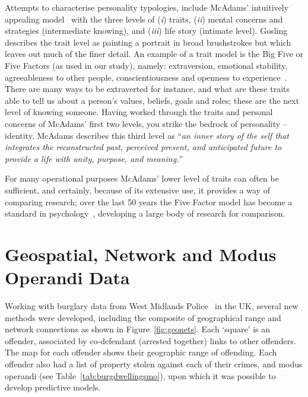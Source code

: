 \documentclass{llncs}
\begin{document}
Attempts to characterise personality typologies, include McAdams'
intuitively appealing model~\cite{adams:1996} with the three levels of
({\emph{i}}) traits, ({\emph{ii}}) mental concerns and strategies
(intermediate knowing), and ({\emph{iii}}) life story (intimate
level). Gosling~\cite{gosling:2009} describes the trait level as
painting a portrait in broad brushstrokes but which leaves out much of
the finer detail. An example of a trait model is the Big Five or Five
Factors (as used in our study), namely: extraversion, emotional
stability, agreeableness to other people, conscientiousness and
openness to experience~\cite{costa+mccrae:1992,norman:1963}. There are
many ways to be extraverted for instance, and what are these traits
able to tell us about a person's values, beliefs, goals and roles;
these are the next level of knowing someone. Having worked through the
traits and personal concerns of McAdams’ first two levels, you strike
the bedrock of personality -- identity. McAdams describes this third
level as ``{\emph{an inner story of the self that integrates the
reconstructed past, perceived present, and anticipated future to
provide a life with unity, purpose, and meaning.}}''

For many operational purposes McAdams' lower level of traits can often
be sufficient, and certainly, because of its extensive use, it
provides a way of comparing research; over the last 50 years the Five
Factor model has become a standard in
psychology~\cite{mairesse-et-al:2007}, developing a large body of
research for comparison.

\section{Geospatial, Network and Modus Operandi Data}\label{geospatial}

Working with burglary data from West Midlands
Police~\cite{oatley+ewart:2003,oatley-et-al:2006a,oatley-et-al:2006b}
in the UK, several new methods were developed, including the composite
of geographical range and network connections as shown in
Figure~\ref{fig:geonets}. Each `square' is an offender, associated by
co-defendant (arrested together) links to other offenders. The map for
each offender shows their geographic range of offending. Each offender
also had a list of property stolen against each of their crimes, and
modus operandi (see Table~\ref{tab:burgdwellingsmo}), upon which it
was possible to develop predictive models.
\end{document}
